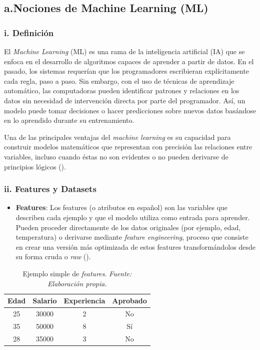 \documentclass[11pt]{article} %
\begin{document}
\subsection{a.Nociones de Machine Learning (ML)}
\vspace{5pt}

\subsubsection{i. Definición} 
\vspace{3pt}

El \textit{Machine Learning} (ML) es una rama de la inteligencia artificial (IA) que se enfoca en el desarrollo de algoritmos capaces de aprender a partir de datos. En el pasado, los sistemas requerían que los programadores escribieran explícitamente cada regla, paso a paso. Sin embargo, con el uso de técnicas de aprendizaje automático, las computadoras pueden identificar patrones y relaciones en los datos sin necesidad de intervención directa por parte del programador. Así, un modelo puede tomar decisiones o hacer predicciones sobre nuevos datos basándose en lo aprendido durante su entrenamiento.

Una de las principales ventajas del \textit{machine learning} es su capacidad para construir modelos matemáticos que representan con precisión las relaciones entre variables, incluso cuando éstas no son evidentes o no pueden derivarse de principios lógicos (\cite{amazon2024}).




\vspace{8pt}
\subsubsection{ii. Features y Datasets}\vspace{2pt}
\begin{itemize}
\item \textbf{Features}: Los features (o atributos en español) son las variables que describen cada ejemplo y que el modelo utiliza como entrada para aprender. Pueden proceder directamente de los datos originales (por ejemplo, edad, temperatura) o derivarse mediante \textit{feature engineering}, proceso que consiste en crear una versión más optimizada de estos features transformándolos desde su forma cruda o \textit{raw} (\cite{googleML2025}).
\end{itemize}

\begin{table}[h]
\centering
\caption{Ejemplo simple de \textit{features}. \textit{Fuente: Elaboración propia.}}

\label{tab:simple_features}
\begin{tabular}{|c|c|c|c|}
\hline
\textbf{Edad} & \textbf{Salario} & \textbf{Experiencia} & \textbf{Aprobado} \\
\hline
25 & 30000 & 2 & No \\
\hline
35 & 50000 & 8 & Sí \\
\hline
28 & 35000 & 3 & No \\
\hline
\end{tabular}
\end{table}
\end{document}

